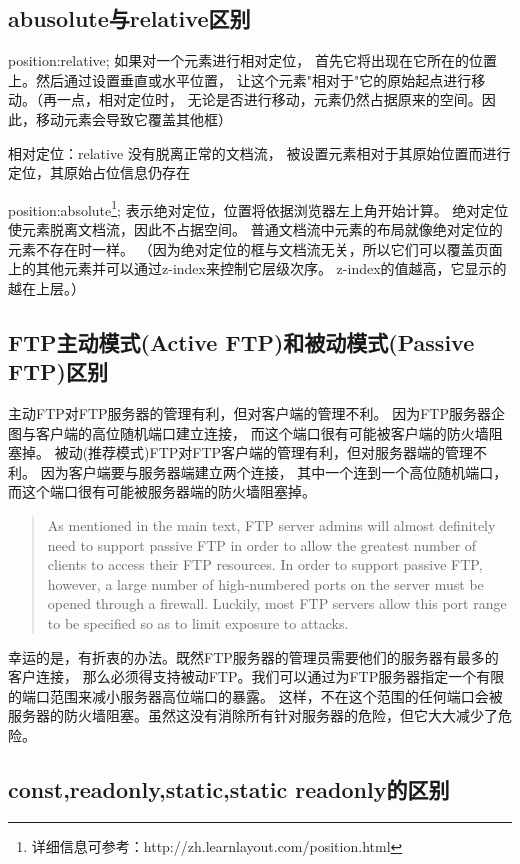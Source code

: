 \documentclass{book}
\begin{document}
\subsection{abusolute与relative区别}

position:relative; 如果对一个元素进行相对定位，
首先它将出现在它所在的位置上。然后通过设置垂直或水平位置，
让这个元素"相对于"它的原始起点进行移动。（再一点，相对定位时，
无论是否进行移动，元素仍然占据原来的空间。因此，移动元素会导致它覆盖其他框）

相对定位：relative 没有脱离正常的文档流，
被设置元素相对于其原始位置而进行定位，其原始占位信息仍存在

position:absolute\footnote{详细信息可参考：http://zh.learnlayout.com/position.html};
表示绝对定位，位置将依据浏览器左上角开始计算。
绝对定位使元素脱离文档流，因此不占据空间。
普通文档流中元素的布局就像绝对定位的元素不存在时一样。
（因为绝对定位的框与文档流无关，所以它们可以覆盖页面上的其他元素并可以通过z-index来控制它层级次序。
z-index的值越高，它显示的越在上层。）

\subsection{FTP主动模式(Active FTP)和被动模式(Passive FTP)区别}

主动FTP对FTP服务器的管理有利，但对客户端的管理不利。
因为FTP服务器企图与客户端的高位随机端口建立连接，
而这个端口很有可能被客户端的防火墙阻塞掉。
被动(推荐模式)FTP对FTP客户端的管理有利，但对服务器端的管理不利。
因为客户端要与服务器端建立两个连接，
其中一个连到一个高位随机端口，而这个端口很有可能被服务器端的防火墙阻塞掉。

\begin{quote}
As mentioned in the main text, 
FTP server admins will almost definitely need to support passive 
FTP in order to allow the greatest number of clients to access their FTP resources. 
In order to support passive FTP, however,
 a large number of high-numbered ports on the server must be opened through a firewall. Luckily, 
 most FTP servers allow this port range to be specified so as to limit exposure to attacks.
\end{quote}

幸运的是，有折衷的办法。既然FTP服务器的管理员需要他们的服务器有最多的客户连接，
那么必须得支持被动FTP。我们可以通过为FTP服务器指定一个有限的端口范围来减小服务器高位端口的暴露。
这样，不在这个范围的任何端口会被服务器的防火墙阻塞。虽然这没有消除所有针对服务器的危险，但它大大减少了危险。

\subsection{const,readonly,static,static readonly的区别}
\end{document}
